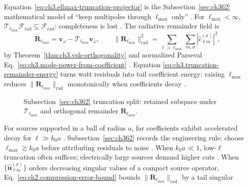 Equation~\eqref{eq:ch3.ellmax-truncation-projector} is the Subsection~\ref{sec:ch362} mathematical model of ``keep
multipoles through \(\ell_{\max}\) only'' \cite{hansen1988}. For \(\ell_{\max}<\infty\),
\(\mathcal{T}_{\ell_{\max}}\mathcal{F}_{\mathrm{rad}}\subsetneq\mathcal{F}_{\mathrm{rad}}\): completeness is lost
\cite{kato1995}.
The radiative remainder field is
\begin{equation}
\label{eq:ch3.truncation-remainder-energy}
\mathbf{R}_{\ell_{\max}}
=
\mathbf{v}_\omega-\mathcal{T}_{\ell_{\max}}\mathbf{v}_\omega,
\qquad
\|\mathbf{R}_{\ell_{\max}}\|_{\mathrm{rad}}^{2}
=
\sum_{\ell>\ell_{\max}}\sum_{m,\sigma}|\widehat{c}_{\ell m}^{(\sigma)}|^{2},
\end{equation}
by Theorem~\ref{thm:ch3.vsh-orthogonality} and normalized Parseval
Eq.~\eqref{eq:ch3.mode-power-from-coefficient} \cite{hansen1988}. Equation
\eqref{eq:ch3.truncation-remainder-energy} turns watt residuals into tail coefficient energy: raising \(\ell_{\max}\)
reduces \(\|\mathbf{R}_{\ell_{\max}}\|_{\mathrm{rad}}\) monotonically when coefficients decay \cite{stratton1941}.
\begin{figure}[t]
\centering
{}
\caption{Subsection~\ref{sec:ch362} truncation split: retained subspace under \(\mathcal{T}_{\ell_{\max}}\) and
orthogonal remainder \(\mathbf{R}_{\ell_{\max}}\).}
\label{fig:ch3.362-truncation-split}
\end{figure}
For sources supported in a ball of radius \(a\), far coefficients exhibit accelerated decay for
\(\ell\gg k_{0}a\) \cite{stratton1941}. Subsection~\ref{sec:ch362} records the engineering
rule: choose \(\ell_{\max}\gtrsim k_{0}a\) before attributing residuals to noise \cite{harrington2001}. When
\(k_{0}a\ll1\), low-\(\ell\) truncation often suffices; electrically large sources demand higher cuts
\cite{stratton1941}.
When \(\{\widehat{\mathbf{u}}_{\ell m}^{(\sigma)}\}\) orders decreasing singular values of a compact source operator,
Eq.~\eqref{eq:ch2.compression-error-bound} bounds \(\|\mathbf{R}_{\ell_{\max}}\|_{\mathrm{rad}}\) by a tail singular
